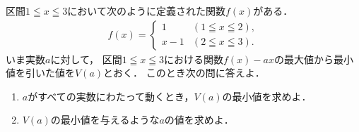 \documentclass[../../main.tex]{subfiles}
\begin{document}
区間$1 \leqq x \leqq 3$において次のように定義された関数$f(x)$がある．
\begin{align*}
  f(x)=
  \begin{cases}
    1 & (1 \leqq x \leqq 2), \\
    x-1 & (2 \leqq x \leqq 3).
  \end{cases}
\end{align*}
いま実数$a$に対して，
区間$1 \leqq x \leqq 3$における関数$f(x)-ax$の最大値から最小値を引いた値を$V(a)$とおく．
このとき次の問に答えよ．
\begin{enumerate}
  \item $a$がすべての実数にわたって動くとき，$V(a)$の最小値を求めよ．
  \item $V(a)$の最小値を与えるような$a$の値を求めよ．
\end{enumerate}
\end{document}
